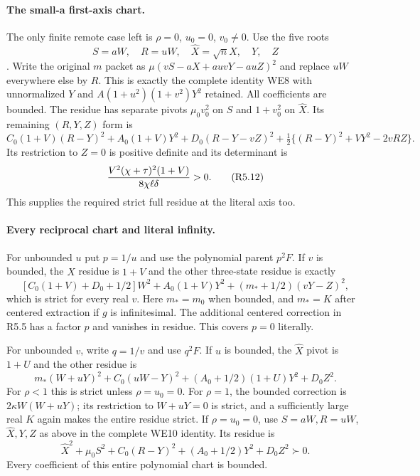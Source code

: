 \paragraph{The small-a first-axis chart.}
The only finite remote case left is $\rho=0$, $u_0=0$, $v_0\ne0$.
Use the five roots
\[
 S=aW,\quad R=uW,\quad \widehat X=\sqrt nX,\quad Y,\quad Z
\]. Write the original $m$ packet as
$\mu(vS-aX+auvY-auZ)^2$ and replace $uW$ everywhere else by $R$.
This is exactly the complete identity WE8 with unnormalized $Y$ and
$A(1+u^2)(1+v^2)Y^2$ retained. All coefficients are bounded.
The residue has separate pivots $\mu_0v_0^2$ on $S$ and
$1+v_0^2$ on $\widehat X$. Its remaining $(R,Y,Z)$ form is
\[
 C_0(1+V)(R-Y)^2+A_0(1+V)Y^2+D_0(R-Y-vZ)^2
 +\tfrac12\{(R-Y)^2+VY^2-2vRZ\}.                  \tag{R5.11}
\]
Its restriction to $Z=0$ is positive definite and its determinant is
\[
 {V^2(\chi+\tau)^2(1+V)\over8\chi\ell\delta}>0.    \tag{R5.12}
\]
This supplies the required strict full residue at the literal axis too.

\paragraph{Every reciprocal chart and literal infinity.}
For unbounded $u$ put $p=1/u$ and use the polynomial parent $p^2F$.
If $v$ is bounded, the $\widehat X$ residue is $1+V$ and the other
three-state residue is exactly
\[
 [C_0(1+V)+D_0+1/2]W^2+A_0(1+V)Y^2
                         +(m_*+1/2)(vY-Z)^2,         \tag{R5.13}
\]
which is strict for every real $v$. Here $m_*=m_0$ when bounded,
and $m_*=K$ after centered extraction if $g$ is infinitesimal.
The additional centered correction in R5.5 has a factor $p$ and
vanishes in residue. This covers $p=0$ literally.

For unbounded $v$, write $q=1/v$ and use $q^2F$. If $u$ is bounded,
the $\widehat X$ pivot is $1+U$ and the other residue is
\[
 m_*(W+uY)^2+C_0(uW-Y)^2+(A_0+1/2)(1+U)Y^2+D_0Z^2.\tag{R5.14}
\]
For $\rho<1$ this is strict unless $\rho=u_0=0$. For $\rho=1$,
the bounded correction is $2\kappa W(W+uY)$; its restriction to
$W+uY=0$ is strict, and a sufficiently large real $K$ again makes
the entire residue strict. If $\rho=u_0=0$, use $S=aW,R=uW$,
$\widehat X,Y,Z$ as above in the complete WE10 identity. Its residue is
\[
 \widehat X^2+\mu_0S^2+C_0(R-Y)^2+(A_0+1/2)Y^2+D_0Z^2\succ0.
                                                               \tag{R5.15}
\]
Every coefficient of this entire polynomial chart is bounded.

